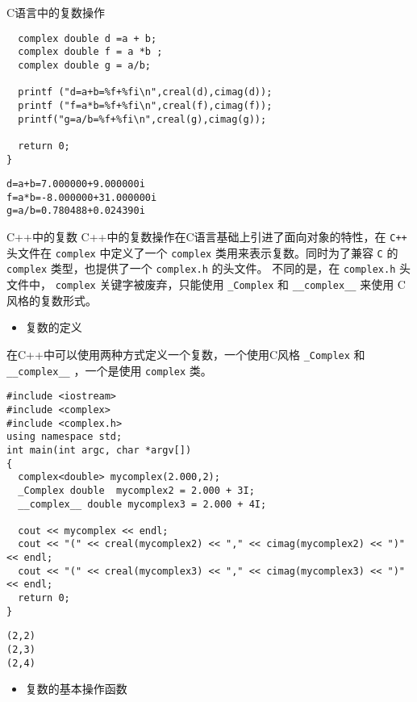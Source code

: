 \documentclass[presentation]{beamer}
\begin{document}
\begin{frame}[fragile,label={sec:org77cb714}]{}
\begin{block}{C语言中的复数操作}
\begin{verbatim}
  complex double d =a + b;
  complex double f = a *b ;
  complex double g = a/b;

  printf ("d=a+b=%f+%fi\n",creal(d),cimag(d));
  printf ("f=a*b=%f+%fi\n",creal(f),cimag(f));
  printf("g=a/b=%f+%fi\n",creal(g),cimag(g));

  return 0;
}
\end{verbatim}

\begin{verbatim}
d=a+b=7.000000+9.000000i
f=a*b=-8.000000+31.000000i
g=a/b=0.780488+0.024390i
\end{verbatim}
\end{block}

\begin{block}{C++中的复数}
 C++中的复数操作在C语言基础上引进了面向对象的特性，在 \texttt{C++} 头文件在 \texttt{complex} 中定义了一个 \texttt{complex} 类用来表示复数。同时为了兼容 \texttt{C} 的 \texttt{complex} 类型，也提供了一个 \texttt{complex.h} 的头文件。
不同的是，在 \texttt{complex.h} 头文件中， \texttt{complex} 关键字被废弃，只能使用 \texttt{\_Complex} 和 \texttt{\_\_complex\_\_} 来使用 C风格的复数形式。

\begin{itemize}
\item 复数的定义
\end{itemize}

 在C++中可以使用两种方式定义一个复数，一个使用C风格 \texttt{\_Complex} 和 \texttt{\_\_complex\_\_} ，一个是使用 \texttt{complex} 类。


\begin{verbatim}
#include <iostream>
#include <complex>
#include <complex.h>
using namespace std;
int main(int argc, char *argv[])
{
  complex<double> mycomplex(2.000,2);
  _Complex double  mycomplex2 = 2.000 + 3I;
  __complex__ double mycomplex3 = 2.000 + 4I;

  cout << mycomplex << endl;
  cout << "(" << creal(mycomplex2) << "," << cimag(mycomplex2) << ")" << endl;
  cout << "(" << creal(mycomplex3) << "," << cimag(mycomplex3) << ")" << endl;
  return 0;
}
\end{verbatim}

\begin{verbatim}
(2,2)
(2,3)
(2,4)
\end{verbatim}


\begin{itemize}
\item 复数的基本操作函数
\end{itemize}


\end{block}
\end{frame}
\end{document}
